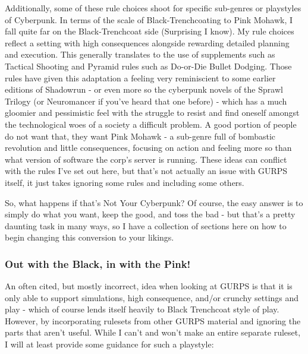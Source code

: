 \begin{multicols}{2}
	Additionally, some of these rule choices shoot for specific sub-genres or playstyles of Cyberpunk. In terms of the scale of Black-Trenchcoating to Pink Mohawk, I fall quite far on the Black-Trenchcoat side (Surprising I know). My rule choices reflect a setting with high consequences alongside rewarding detailed planning and execution. This generally translates to the use of supplements such as Tactical Shooting and Pyramid rules such as Do-or-Die Bullet Dodging. Those rules have given this adaptation a feeling very reminiscient to some earlier editions of Shadowrun - or even more so the cyberpunk novels of the Sprawl Trilogy (or Neuromancer if you've heard that one before) - which has a much gloomier and pessimistic feel with the struggle to resist and find oneself amongst the technological woes of a society a difficult problem. A good portion of people do not want that, they want Pink Mohawk - a sub-genre full of bombastic revolution and little consequences, focusing on action and feeling more so than what version of software the corp's server is running. These ideas can conflict with the rules I've set out here, but that's not actually an issue with GURPS itself, it just takes ignoring some rules and including some others.
	
	So, what happens if that's Not Your Cyberpunk? Of course, the easy answer is to simply do what you want, keep the good, and toss the bad - but that's a pretty daunting task in many ways, so I have a collection of sections here on how to begin changing this conversion to your likings.
	
	\subsubsection{Out with the Black, in with the Pink!}
	
	An often cited, but mostly incorrect, idea when looking at GURPS is that it is only able to support simulations, high consequence, and/or crunchy settings and play - which of course lends itself heavily to Black Trenchcoat style of play. However, by incorporating rulesets from other GURPS material and ignoring the parts that aren't useful. While I can't and won't make an entire separate ruleset, I will at least provide some guidance for such a playstyle:
	

\end{multicols}
